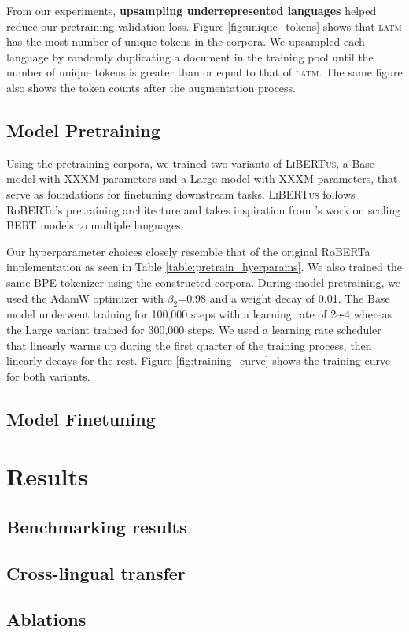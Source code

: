 \documentclass[11pt]{article}
\newcommand{\libertus}{\textsc{LiBERTus}}
\begin{document}
From our experiments, \textbf{upsampling underrepresented languages} helped reduce our pretraining validation loss.
Figure \ref{fig:unique_tokens} shows that \textsc{latm} has the most number of unique tokens in the corpora.
We upsampled each language by randomly duplicating a document in the training pool until the number of unique tokens is greater than or equal to that of \textsc{latm}.
The same figure also shows the token counts after the augmentation process.

\subsection{Model Pretraining}

Using the pretraining corpora, we trained two variants of \libertus{}, a Base model with XXXM parameters and a Large model with XXXM parameters, that serve as foundations for finetuning downstream tasks.
\libertus{} follows RoBERTa's pretraining architecture \cite{liu-etal-2019-roberta} and takes inspiration from \citet{conneau-etal-2020-unsupervised}'s work on scaling BERT models to multiple languages.

Our hyperparameter choices closely resemble that of the original RoBERTa implementation as seen in Table \ref{table:pretrain_hyerparams}.
We also trained the same BPE tokenizer \citep{sennrich-etal-2016-neural} using the constructed corpora.
During model pretraining, we used the AdamW optimizer with $\beta_2$=0.98 and a weight decay of 0.01.
The Base model underwent training for 100,000 steps with a learning rate of 2e-4 whereas the Large variant trained for 300,000 steps.
We used a learning rate scheduler that linearly warms up during the first quarter of the training process, then linearly decays for the rest.
Figure \ref{fig:training_curve} shows the training curve for both variants.





\subsection{Model Finetuning}


\section{Results}


\subsection{Benchmarking results}


\subsection{Cross-lingual transfer}


\subsection{Ablations}





\end{document}
